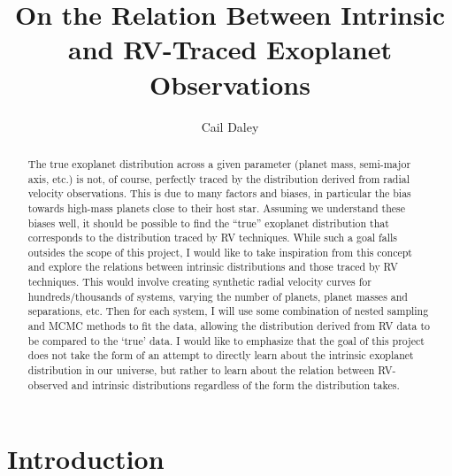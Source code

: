 \documentclass[12pt,manuscript]{aastex}
\begin{document}
\newcommand{\Msun}{M_\odot}
\newcommand{\Lsun}{L_\odot}
\newcommand{\Rsun}{R_\odot}
\newcommand{\Mearth}{M_\oplus}
\newcommand{\Learth}{L_\oplus}
\newcommand{\Rearth}{R_\oplus}
\newcommand{\Mjup}{M_{Jup}}
 
\title{On the Relation Between Intrinsic and RV-Traced Exoplanet Observations}
\author{Cail Daley}


\begin{abstract}

The true exoplanet distribution across a given parameter (planet mass, semi-major axis, etc.)  is not, of course, perfectly traced by the distribution derived from radial velocity observations. 
This is due to many factors and biases, in particular the bias towards high-mass planets close to their host star. 
Assuming we understand these biases well, it should be possible to find the “true” exoplanet distribution that corresponds to the distribution traced by RV techniques. 
While such a goal falls outsides the scope of this project, I would like to take inspiration from this concept and explore the relations between intrinsic distributions and those traced by RV techniques.
This would involve creating synthetic radial velocity curves for hundreds/thousands of systems, varying the number of planets, planet masses and separations, etc. Then for each system, I will use some combination of nested sampling and MCMC methods to fit the data, allowing the distribution derived from RV data to be compared to the `true' data. 
I would like to emphasize that the goal of this project does not take the form of an attempt to directly learn about the intrinsic exoplanet distribution in our universe, but rather to learn about the relation between RV-observed and intrinsic distributions regardless of the form the distribution takes.

\end{abstract}


\newpage

\section{Introduction}
\label{section: intro}
\end{document}
